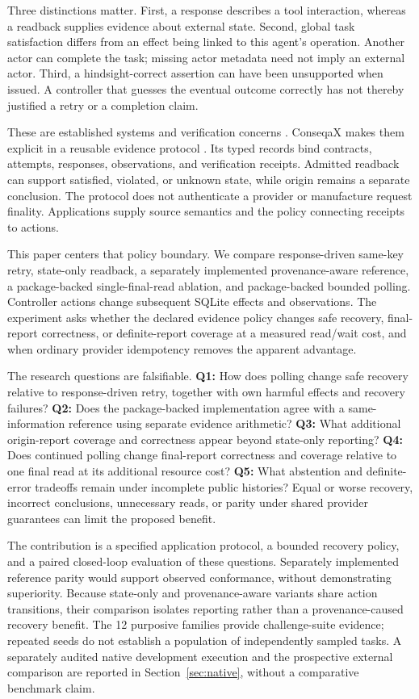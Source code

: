 \documentclass[conference]{IEEEtran}
\begin{document}
Three distinctions matter. First, a response describes a tool interaction, whereas a readback supplies evidence about external state. Second, global task satisfaction differs from an effect being linked to this agent's operation. Another actor can complete the task; missing actor metadata need not imply an external actor. Third, a hindsight-correct assertion can have been unsupported when issued. A controller that guesses the eventual outcome correctly has not thereby justified a retry or a completion claim.

These are established systems and verification concerns \cite{helland,vogels,verified,operability,agenttool,limbo}. ConseqaX makes them explicit in a reusable evidence protocol \cite{artifact}. Its typed records bind contracts, attempts, responses, observations, and verification receipts. Admitted readback can support satisfied, violated, or unknown state, while origin remains a separate conclusion. The protocol does not authenticate a provider or manufacture request finality. Applications supply source semantics and the policy connecting receipts to actions.

This paper centers that policy boundary. We compare response-driven same-key retry, state-only readback, a separately implemented provenance-aware reference, a package-backed single-final-read ablation, and package-backed bounded polling. Controller actions change subsequent SQLite effects and observations. The experiment asks whether the declared evidence policy changes safe recovery, final-report correctness, or definite-report coverage at a measured read/wait cost, and when ordinary provider idempotency removes the apparent advantage.

The research questions are falsifiable. \textbf{Q1:} How does polling change safe recovery relative to response-driven retry, together with own harmful effects and recovery failures? \textbf{Q2:} Does the package-backed implementation agree with a same-information reference using separate evidence arithmetic? \textbf{Q3:} What additional origin-report coverage and correctness appear beyond state-only reporting? \textbf{Q4:} Does continued polling change final-report correctness and coverage relative to one final read at its additional resource cost? \textbf{Q5:} What abstention and definite-error tradeoffs remain under incomplete public histories? Equal or worse recovery, incorrect conclusions, unnecessary reads, or parity under shared provider guarantees can limit the proposed benefit.

The contribution is a specified application protocol, a bounded recovery policy, and a paired closed-loop evaluation of these questions. Separately implemented reference parity would support observed conformance, without demonstrating superiority. Because state-only and provenance-aware variants share action transitions, their comparison isolates reporting rather than a provenance-caused recovery benefit. The 12 purposive families provide challenge-suite evidence; repeated seeds do not establish a population of independently sampled tasks. A separately audited native development execution and the prospective external comparison are reported in Section~\ref{sec:native}, without a comparative benchmark claim.
\end{document}
